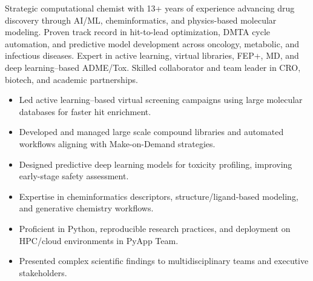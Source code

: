 \documentclass[10pt,a4paper,ragged2e,withhyper]{altacv}
\begin{document}

\makecvheader

Strategic computational chemist with 13+ years of experience advancing drug discovery through AI/ML, cheminformatics, and physics-based molecular modeling. Proven track record in hit-to-lead optimization, DMTA cycle automation, and predictive model development across oncology, metabolic, and infectious diseases. Expert in active learning, virtual libraries, FEP+, MD, and deep learning–based ADME/Tox. Skilled collaborator and team leader in CRO, biotech, and academic partnerships.




\begin{itemize}[leftmargin=*,labelsep=5pt,itemsep=2pt,parsep=0pt] %
    \item Led active learning–based virtual screening campaigns using large molecular databases for faster hit enrichment.
    \item Developed and managed large scale compound libraries and automated workflows aligning with Make-on-Demand strategies.
    \item Designed predictive deep learning models for toxicity profiling, improving early-stage safety assessment.
    \item Expertise in cheminformatics descriptors, structure/ligand-based modeling, and generative chemistry workflows.
    \item Proficient in Python, reproducible research practices, and deployment on HPC/cloud environments in PyApp Team.
    \item Presented complex scientific findings to multidisciplinary teams and executive stakeholders.
\end{itemize}
\end{document}
